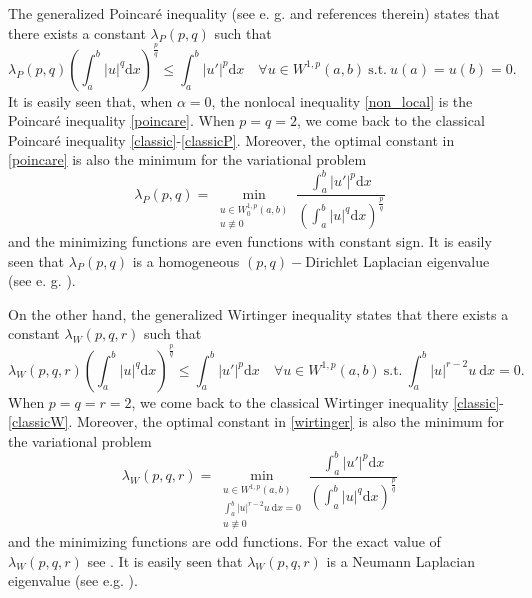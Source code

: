 \documentclass{amsart}
\theoremstyle{definition}
\theoremstyle{remark}
\begin{document}
The generalized Poincar\'e inequality (see e. g. \cite{GGR} and references therein) states that there exists a constant $\lambda_P(p,q)$ such that
\begin{equation}
\label{poincare}
\lambda_P(p,q) \left(\int_a^b|u|^q\text{d}x\right)^\frac pq\leq \int_a^b|u'|^p\text{d}x\quad\forall u \in W^{1,p}(a,b)\ \text{s.t.}\ u(a)=u(b)=0.
\end{equation}
It is easily seen that, when $\alpha=0$, the nonlocal inequality \eqref{non_local} is the Poincar\'e inequality \eqref{poincare}.
When $p=q=2$, we come back to the classical Poincar\'e inequality \eqref{classic}-\eqref{classicP}. Moreover, the optimal constant in \eqref{poincare} is also the minimum for the variational problem
\begin{equation*}%
\lambda_P(p,q) =\min_{\substack{u\in W^{1,p}_0(a,b)\\ u\not\equiv 0}}\frac{ \int_a^b|u'|^p\text{d}x}{\left(\int_a^b|u|^q\text{d}x\right)^\frac pq}
\end{equation*}
and the minimizing functions are even functions with constant sign. It is easily seen that $\lambda_P(p,q)$ is a homogeneous $(p,q)-$Dirichlet Laplacian eigenvalue (see e. g. \cite[Th. 3.3]{LE}). %

On the other hand, the generalized Wirtinger inequality states that there exists a constant $\lambda_W(p,q,r)$ such that 
\begin{equation}
\label{wirtinger}
\lambda_W(p,q,r) \left(\int_a^b|u|^q\text{d}x\right)^\frac pq\leq\int_a^b|u'|^p\text{d}x\quad\forall u \in W^{1,p}(a,b)\ \text{s.t.}\ \int_a^b |u|^{r-2}u\ \text{d}x=0.
\end{equation}
 When $p=q=r=2$, we come back to the classical Wirtinger inequality \eqref{classic}-\eqref{classicW}. 
Moreover, the optimal constant in \eqref{wirtinger} is also the minimum for the variational problem 
\[
\lambda_W(p,q,r) =\min_{\substack{u\in W^{1,p}(a,b)\\ \int_a^b |u|^{r-2}u\ \text{d}x=0\\ u\not\equiv 0 }}\frac{\int_a^b|u'|^p\text{d}x}{\left(\int_a^b|u|^q\text{d}x\right)^\frac pq}
\]
and the minimizing functions are odd functions. For the exact value of $\lambda_W(p,q,r)$ see \cite{GN}. It is easily seen that $\lambda_W(p,q,r)$ is a Neumann Laplacian eigenvalue (see e.g. \cite[Th. 3.4]{LE}). 
\end{document}
